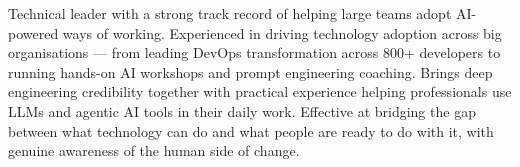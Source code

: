 
\begin{cvparagraph}

Technical leader with a strong track record of helping large teams adopt AI-powered ways of working. Experienced in driving technology adoption across big organisations — from leading DevOps transformation across 800+ developers to running hands-on AI workshops and prompt engineering coaching. Brings deep engineering credibility together with practical experience helping professionals use LLMs and agentic AI tools in their daily work. Effective at bridging the gap between what technology can do and what people are ready to do with it, with genuine awareness of the human side of change.

\end{cvparagraph}
